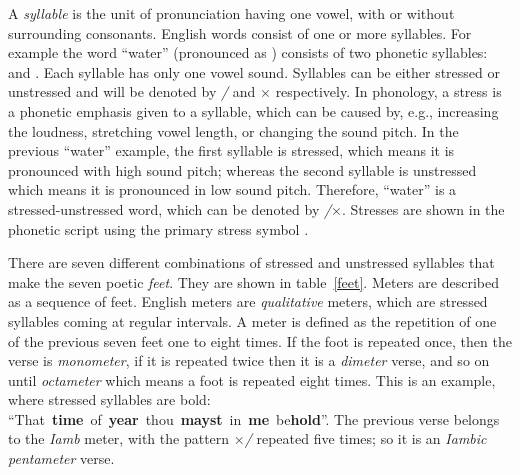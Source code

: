 \documentclass[journal,10pt,twocolumns,letter]{IEEEtran}
\begin{document}
A \textit{syllable} is the unit of pronunciation having one vowel, with or without surrounding
consonants. English words consist of one or more syllables. For example the word \mbox{``water''}
(pronounced as \mbox{}) consists of two phonetic syllables:
\mbox{} and \mbox{}. Each syllable has only one
vowel sound. Syllables can be either stressed or unstressed and will be denoted by \textit{/} and
$\times$ respectively. In phonology, a stress is a phonetic emphasis given to a syllable, which can
be caused by, e.g., increasing the loudness, stretching vowel length, or changing the sound
pitch. In the previous ``water'' example, the first syllable is stressed, which means it is
pronounced with high sound pitch; whereas the second syllable is unstressed which means it is
pronounced in low sound pitch. Therefore, ``water'' is a stressed-unstressed word, which can be
denoted by \mbox{\textit{/}$\times$}. Stresses are shown in the phonetic script using the primary stress
symbol .
\begin{table}[!tb]
  \centering
  \caption{The seven feet of English poem. Every foot is a combination of stressed and unstressed
    syllables, denoted by \textit{/} and \textit{x} respectively.}\label{feet}
\end{table}
There are seven different combinations of stressed and unstressed syllables that make the seven
poetic \textit{feet}.  They are shown in table~\ref{feet}. Meters are described as a sequence of
feet. English meters are \textit{qualitative} meters, which are stressed syllables coming at regular
intervals. A meter is defined as the repetition of one of the previous seven feet one to eight
times. If the foot is repeated once, then the verse is \textit{monometer}, if it is repeated twice
then it is a \textit{dimeter} verse, and so on until \textit{octameter} which means a foot is
repeated eight times. This is an example, where stressed syllables are bold: \mbox{``That
  \textbf{time} of \textbf{year} thou \textbf{mayst} in \textbf{me} be\textbf{hold}''}. The previous
verse belongs to the \textit{Iamb} meter, with the pattern \mbox{$\times$\textit{/}} repeated five times;
so it is an \textit{Iambic pentameter} verse.
\end{document}
